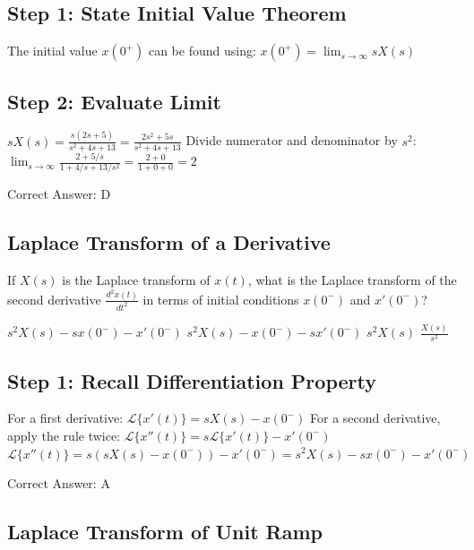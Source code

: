 \begin{solution}

\subsection*{Step 1: State Initial Value Theorem}
The initial value $x(0^+)$ can be found using:
$x(0^+) = \lim_{s \to \infty} s X(s)$

\subsection*{Step 2: Evaluate Limit}
$s X(s) = \frac{s(2s + 5)}{s^2 + 4s + 13} = \frac{2s^2 + 5s}{s^2 + 4s + 13}$
Divide numerator and denominator by $s^2$:
$\lim_{s \to \infty} \frac{2 + 5/s}{1 + 4/s + 13/s^2} = \frac{2 + 0}{1 + 0 + 0} = 2$

Correct Answer: D
\end{solution}

\clearpage

\subsection{Laplace Transform of a Derivative}

If $X(s)$ is the Laplace transform of $x(t)$, what is the Laplace transform of the second derivative $\frac{d^2 x(t)}{dt^2}$ in terms of initial conditions $x(0^-)$ and $x'(0^-)$?

\begin{choices}
    \correctchoice $s^2 X(s) - s x(0^-) - x'(0^-)$
    \choice $s^2 X(s) - x(0^-) - s x'(0^-)$
    \choice $s^2 X(s)$
    \choice $\frac{X(s)}{s^2}$
\end{choices}

\begin{solution}

\subsection*{Step 1: Recall Differentiation Property}
For a first derivative:
$\mathcal{L}\{x'(t)\} = s X(s) - x(0^-)$
For a second derivative, apply the rule twice:
$\mathcal{L}\{x''(t)\} = s \mathcal{L}\{x'(t)\} - x'(0^-)$
$\mathcal{L}\{x''(t)\} = s (s X(s) - x(0^-)) - x'(0^-) = s^2 X(s) - s x(0^-) - x'(0^-)$

Correct Answer: A
\end{solution}

\clearpage

\subsection{Laplace Transform of Unit Ramp}

